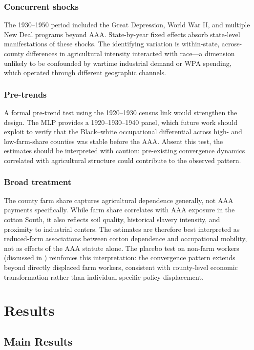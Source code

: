 \documentclass[12pt]{article}
\begin{document}
\subsubsection*{Concurrent shocks} The 1930--1950 period included the Great Depression, World War II, and multiple New Deal programs beyond AAA. State-by-year fixed effects absorb state-level manifestations of these shocks. The identifying variation is within-state, across-county differences in agricultural intensity interacted with race---a dimension unlikely to be confounded by wartime industrial demand or WPA spending, which operated through different geographic channels.

\subsubsection*{Pre-trends} A formal pre-trend test using the 1920--1930 census link would strengthen the design. The MLP provides a 1920--1930--1940 panel, which future work should exploit to verify that the Black--white occupational differential across high- and low-farm-share counties was stable before the AAA. Absent this test, the estimates should be interpreted with caution: pre-existing convergence dynamics correlated with agricultural structure could contribute to the observed pattern.

\subsubsection*{Broad treatment} The county farm share captures agricultural dependence generally, not AAA payments specifically. While farm share correlates with AAA exposure in the cotton South, it also reflects soil quality, historical slavery intensity, and proximity to industrial centers. The estimates are therefore best interpreted as reduced-form associations between cotton dependence and occupational mobility, not as effects of the AAA statute alone. The placebo test on non-farm workers (discussed in ) reinforces this interpretation: the convergence pattern extends beyond directly displaced farm workers, consistent with county-level economic transformation rather than individual-specific policy displacement.

\section{Results}
\label{sec:results}

\subsection{Main Results}
\end{document}
